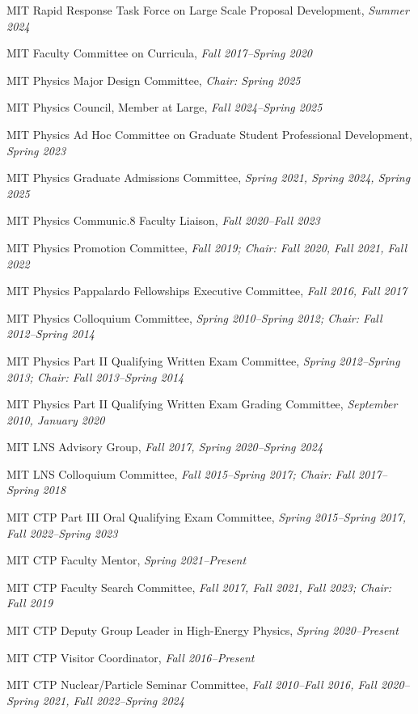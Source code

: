 \bbl
\item MIT Rapid Response Task Force on Large Scale Proposal Development, \emph{Summer 2024}
\item MIT Faculty Committee on Curricula, \emph{Fall 2017--Spring 2020}
\item MIT Physics Major Design Committee, \emph{Chair: Spring 2025}
\item MIT Physics Council, Member at Large, \emph{Fall 2024--Spring 2025}
\item MIT Physics Ad Hoc Committee on Graduate Student Professional Development, \emph{Spring 2023}
\item MIT Physics Graduate Admissions Committee, \emph{Spring 2021, Spring 2024, Spring 2025}
\item MIT Physics Communic.8 Faculty Liaison, \emph{Fall 2020--Fall 2023}
\item MIT Physics Promotion Committee, \emph{Fall 2019; Chair: Fall 2020, Fall 2021, Fall 2022}
\item MIT Physics Pappalardo Fellowships Executive Committee, \emph{Fall 2016, Fall 2017}
\item MIT Physics Colloquium Committee, \emph{Spring 2010--Spring 2012; Chair: Fall 2012--Spring 2014}
\item MIT Physics Part II Qualifying Written Exam Committee, \emph{Spring 2012--Spring 2013; Chair: Fall 2013--Spring 2014}
\item MIT Physics Part II Qualifying Written Exam Grading Committee, \emph{September 2010, January 2020}
\item MIT LNS Advisory Group, \emph{Fall 2017, Spring 2020--Spring 2024}
\item MIT LNS Colloquium Committee, \emph{Fall 2015--Spring 2017; Chair: Fall 2017--Spring 2018}
\item MIT CTP Part III Oral Qualifying Exam Committee, \emph{Spring 2015--Spring 2017, Fall 2022--Spring 2023}
\item MIT CTP Faculty Mentor, \emph{Spring 2021--Present}
\item MIT CTP Faculty Search Committee, \emph{Fall 2017, Fall 2021, Fall 2023; Chair: Fall 2019}
\item MIT CTP Deputy Group Leader in High-Energy Physics, \emph{Spring 2020--Present}
\item MIT CTP Visitor Coordinator, \emph{Fall 2016--Present}
\item MIT CTP Nuclear/Particle Seminar Committee, \emph{Fall 2010--Fall 2016, Fall 2020--Spring 2021, Fall 2022--Spring 2024}
